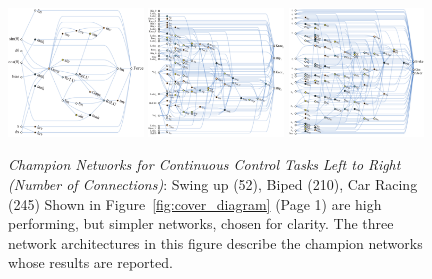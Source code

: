 
\begin{figure}[ht!]
\vskip -0.00in %
    \centering      
    \includegraphics[width=0.32\textwidth]{img/champ_swingup.pdf}  
    \includegraphics[width=0.32\textwidth]{img/champ_biped.pdf}  
    \includegraphics[width=0.32\textwidth]{img/champ_carracing.pdf}  
\vskip -0.00in %
    \caption      
    {     
    \textit{Champion Networks for Continuous Control Tasks}
    \newline
	\textit{Left to Right (Number of Connections)}: Swing up (52), Biped (210), Car Racing (245)
    \newline
    Shown in Figure~\ref{fig:cover_diagram} (Page 1) are high performing, but simpler networks, chosen for clarity. The three network architectures in this figure describe the champion networks whose results are reported.
    }         
    \label{fig:nets}
\vskip -0.0in %
\end{figure}
